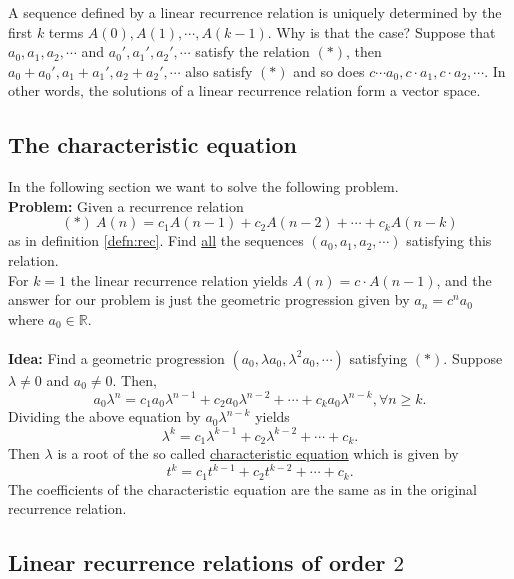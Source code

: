 \begin{remark}
A sequence defined by a linear recurrence relation is uniquely determined by the first $k$ terms $A(0), A(1), \cdots, A(k-1)$.
Why is that the case? Suppose that $a_0, a_1, a_2, \cdots$ and $a_0', a_1', a_2', \cdots$ satisfy the relation $(*)$,
then $a_0+a_0', a_1+a_1',a_2+a_2', \cdots$ also satisfy $(*)$ and so does $c \cdots a_0, c \cdot a_1, c \cdot a_2, \cdots$.
In other words, the solutions of a linear recurrence relation form a vector space.
\end{remark}

\subsection[The characteristic equation]{The characteristic equation}

In the following section we want to solve the following problem.\\
\textbf{Problem:} Given a recurrence relation
$$
(*)\ A(n)=c_1A(n-1)+c_2A(n-2)+\cdots+c_kA(n-k)
$$
as in definition \ref{defn:rec}. Find \underline{all} the sequences $(a_0, a_1, a_2, \cdots)$ satisfying this relation.
\\
For $k=1$ the linear recurrence relation yields $A(n)=c \cdot A(n-1)$, and the answer for our problem is just the geometric progression 
given by $a_n=c^n a_0$ where $a_0 \in \mathbb{R}$.
\\
\\
\noindent
\textbf{Idea:} Find a geometric progression $(a_0, \lambda a_0, \lambda^2 a_0, \cdots)$ satisfying $(*)$. Suppose $\lambda \neq 0$ and $a_0 \neq 0$.
Then,
$$
a_0 \lambda^n=c_1 a_0 \lambda^{n-1}+c_2 a_0 \lambda^{n-2} + \cdots + c_k a_0 \lambda^{n-k}, \forall n \geq k.
$$
Dividing the above equation by $a_0 \lambda^{n-k}$ yields 
$$
\lambda^k=c_1 \lambda^{k-1} + c_2 \lambda^{k-2} + \cdots + c_k.
$$
Then $\lambda$ is a root of the so called \underline{characteristic equation} which is given by
$$
t^k=c_1t^{k-1}+c_2 t^{k-2} + \cdots + c_k.
$$
The coefficients of the characteristic equation are the same as in the original recurrence relation.

\subsection{Linear recurrence relations of order $2$}


